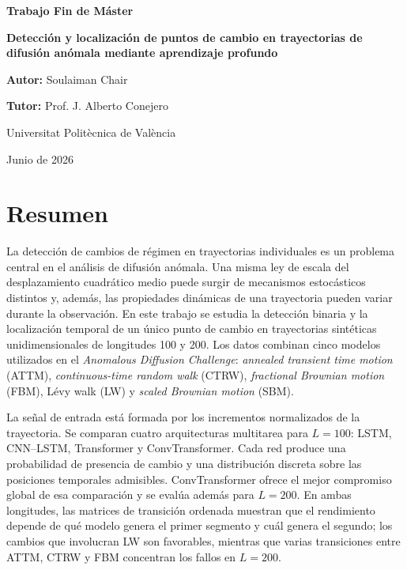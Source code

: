 \documentclass[a4paper,12pt]{article}
\begin{document}
\begin{titlepage}
\centering
\vspace*{1.8cm}
{\Large \textbf{Trabajo Fin de Máster}\par}
\vspace{1.4cm}
{\huge \textbf{Detección y localización de puntos de cambio en trayectorias de difusión anómala mediante aprendizaje profundo}\par}
\vspace{2cm}
{\Large \textbf{Autor:} Soulaiman Chair\par}
\vspace{0.5cm}
{\Large \textbf{Tutor:} Prof. J. Alberto Conejero\par}
\vspace{1.5cm}
{\large Universitat Politècnica de València\par}
\vfill
{\large Junio de 2026\par}
\end{titlepage}

\section*{Resumen}

La detección de cambios de régimen en trayectorias individuales es un problema central en el análisis de difusión anómala. Una misma ley de escala del desplazamiento cuadrático medio puede surgir de mecanismos estocásticos distintos y, además, las propiedades dinámicas de una trayectoria pueden variar durante la observación. En este trabajo se estudia la detección binaria y la localización temporal de un único punto de cambio en trayectorias sintéticas unidimensionales de longitudes 100 y 200. Los datos combinan cinco modelos utilizados en el \emph{Anomalous Diffusion Challenge}: \emph{annealed transient time motion} (ATTM), \emph{continuous-time random walk} (CTRW), \emph{fractional Brownian motion} (FBM), Lévy walk (LW) y \emph{scaled Brownian motion} (SBM).

La señal de entrada está formada por los incrementos normalizados de la trayectoria. Se comparan cuatro arquitecturas multitarea para $L=100$: LSTM, CNN--LSTM, Transformer y ConvTransformer. Cada red produce una probabilidad de presencia de cambio y una distribución discreta sobre las posiciones temporales admisibles. ConvTransformer ofrece el mejor compromiso global de esa comparación y se evalúa además para $L=200$. En ambas longitudes, las matrices de transición ordenada muestran que el rendimiento depende de qué modelo genera el primer segmento y cuál genera el segundo; los cambios que involucran LW son favorables, mientras que varias transiciones entre ATTM, CTRW y FBM concentran los fallos en $L=200$.
\end{document}
